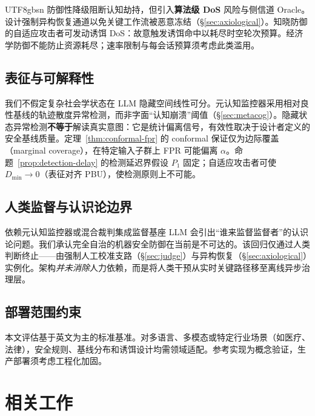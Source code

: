 \documentclass[letterpaper,twocolumn,10pt]{article}
\begin{document}
\begin{CJK}{UTF8}{gbsn}
防御性降级阻断认知劫持，但引入\textbf{算法级 DoS} 风险与侧信道 Oracle。设计强制异构恢复通道以免关键工作流被恶意冻结（\S\ref{sec:axiological}）。知晓防御的自适应攻击者可发动诱饵 DoS：故意触发诱饵命中以耗尽时空轮次预算。经济学防御不能防止资源耗尽；速率限制与每会话预算须考虑此类滥用。

\subsection{表征与可解释性}

我们不假定复杂社会学状态在 LLM 隐藏空间线性可分。元认知监控器采用相对良性基线的轨迹散度异常检测，而非字面``认知崩溃''阈值（\S\ref{sec:metacog}）。隐藏状态异常检测\textbf{不等于}解读真实意图：它是统计偏离信号，有效性取决于设计者定义的安全基线质量。定理~\ref{thm:conformal-fpr} 的 conformal 保证仅为边际覆盖（marginal coverage），在特定输入子群上 FPR 可能偏离 $\alpha$。命题~\ref{prop:detection-delay} 的检测延迟界假设 $P_1$ 固定；自适应攻击者可使 $D_{\min} \to 0$（表征对齐 PBU），使检测原则上不可能。

\subsection{人类监督与认识论边界}

依赖元认知监控器或混合裁判集成监督基座 LLM 会引出``谁来监督监督者''的认识论问题。我们承认完全自治的机器安全防御在当前是不可达的。该回归仅通过人类判断终止——由强制人工校准支路（\S\ref{sec:judge}）与异构恢复（\S\ref{sec:axiological}）实例化。架构\emph{并未消除}人力依赖，而是将人类干预从实时关键路径移至离线异步治理层。

\subsection{部署范围约束}

本文评估基于英文为主的标准基准。对多语言、多模态或特定行业场景（如医疗、法律），安全规则、基线分布和诱饵设计均需领域适配。参考实现为概念验证，生产部署须考虑工程化加固。

\section{相关工作}
\label{sec:related}


\end{CJK}
\end{document}
